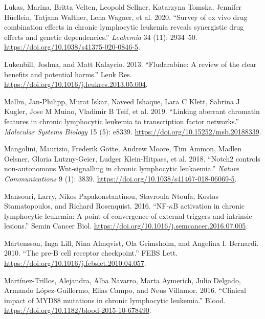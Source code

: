 \documentclass[11pt, a4paper, twosided]{book}
\newenvironment{CSLReferences}%
  {}%
  {\par}
\begin{document}
\begin{CSLReferences}{1}{0}
\leavevmode{}%
Lukas, Marina, Britta Velten, Leopold Sellner, Katarzyna Tomska, Jennifer Hüellein, Tatjana Walther, Lena Wagner, et al. 2020. {``{Survey of ex vivo drug combination effects in chronic lymphocytic leukemia reveals synergistic drug effects and genetic dependencies}.''} \emph{Leukemia} 34 (11): 2934--50. \url{https://doi.org/10.1038/s41375-020-0846-5}.

\leavevmode{}%
Lukenbill, Joshua, and Matt Kalaycio. 2013. {``{Fludarabine: A review of the clear benefits and potential harms}.''} Leuk Res. \url{https://doi.org/10.1016/j.leukres.2013.05.004}.

\leavevmode{}%
Mallm, Jan-Philipp, Murat Iskar, Naveed Ishaque, Lara C Klett, Sabrina J Kugler, Jose M Muino, Vladimir B Teif, et al. 2019. {``{Linking aberrant chromatin features in chronic lymphocytic leukemia to transcription factor networks.}''} \emph{Molecular Systems Biology} 15 (5): e8339. \url{https://doi.org/10.15252/msb.20188339}.

\leavevmode{}%
Mangolini, Maurizio, Frederik Götte, Andrew Moore, Tim Ammon, Madlen Oelsner, Gloria Lutzny-Geier, Ludger Klein-Hitpass, et al. 2018. {``{Notch2 controls non-autonomous Wnt-signalling in chronic lymphocytic leukaemia}.''} \emph{Nature Communications} 9 (1): 3839. \url{https://doi.org/10.1038/s41467-018-06069-5}.

\leavevmode{}%
Mansouri, Larry, Nikos Papakonstantinou, Stavroula Ntoufa, Kostas Stamatopoulos, and Richard Rosenquist. 2016. {``{NF-\(\kappa\)B activation in chronic lymphocytic leukemia: A point of convergence of external triggers and intrinsic lesions}.''} Semin Cancer Biol. \url{https://doi.org/10.1016/j.semcancer.2016.07.005}.

\leavevmode{}%
Mårtensson, Inga Lill, Nina Almqvist, Ola Grimsholm, and Angelina I. Bernardi. 2010. {``{The pre-B cell receptor checkpoint}.''} FEBS Lett. \url{https://doi.org/10.1016/j.febslet.2010.04.057}.

\leavevmode{}%
Martínez-Trillos, Alejandra, Alba Navarro, Marta Aymerich, Julio Delgado, Armando López-Guillermo, Elias Campo, and Neus Villamor. 2016. {``{Clinical impact of MYD88 mutations in chronic lymphocytic leukemia}.''} Blood. \url{https://doi.org/10.1182/blood-2015-10-678490}.


\end{CSLReferences}
\end{document}

